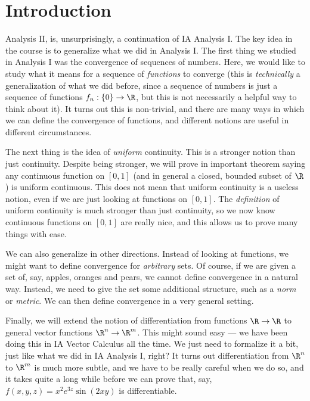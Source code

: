 \documentclass[a4paper]{article}
\begin{document}
\tableofcontents

\setcounter{section}{-1}
\section{Introduction}
Analysis II, is, unsurprisingly, a continuation of IA Analysis I. The key idea in the course is to generalize what we did in Analysis I. The first thing we studied in Analysis I was the convergence of sequences of numbers. Here, we would like to study what it means for a sequence of \emph{functions} to converge (this is \emph{technically} a generalization of what we did before, since a sequence of numbers is just a sequence of functions $f_n: \{0\} \to \R$, but this is not necessarily a helpful way to think about it). It turns out this is non-trivial, and there are many ways in which we can define the convergence of functions, and different notions are useful in different circumstances.

The next thing is the idea of \emph{uniform} continuity. This is a stronger notion than just continuity. Despite being stronger, we will prove in important theorem saying any continuous function on $[0, 1]$ (and in general a closed, bounded subset of $\R$) is uniform continuous. This does not mean that uniform continuity is a useless notion, even if we are just looking at functions on $[0, 1]$. The \emph{definition} of uniform continuity is much stronger than just continuity, so we now know continuous functions on $[0, 1]$ are really nice, and this allows us to prove many things with ease.

We can also generalize in other directions. Instead of looking at functions, we might want to define convergence for \emph{arbitrary} sets. Of course, if we are given a set of, say, apples, oranges and pears, we cannot define convergence in a natural way. Instead, we need to give the set some additional structure, such as a \emph{norm} or \emph{metric}. We can then define convergence in a very general setting.

Finally, we will extend the notion of differentiation from functions $\R \to \R$ to general vector functions $\R^n \to \R^m$. This might sound easy --- we have been doing this in IA Vector Calculus all the time. We just need to formalize it a bit, just like what we did in IA Analysis I, right? It turns out differentiation from $\R^n$ to $\R^m$ is much more subtle, and we have to be really careful when we do so, and it takes quite a long while before we can prove that, say, $f(x, y, z) = x^2 e^{3z} \sin (2xy)$ is differentiable.
\end{document}
